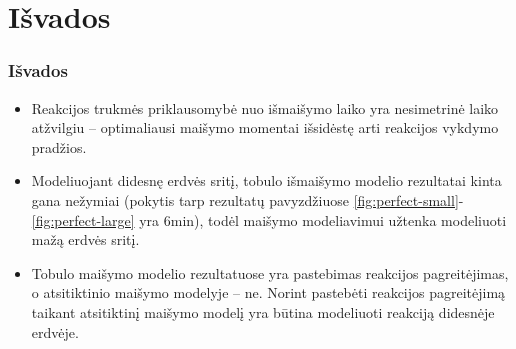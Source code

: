 \documentclass{beamer}
\begin{document}

\section{Išvados}

\begin{frame}
\frametitle{Išvados}
\begin{itemize}
      
  \item Reakcijos trukmės priklausomybė nuo išmaišymo laiko yra nesimetrinė laiko atžvilgiu -- optimaliausi maišymo momentai išsidėstę arti reakcijos vykdymo pradžios.

  \item Modeliuojant didesnę erdvės sritį, tobulo išmaišymo modelio rezultatai kinta gana nežymiai (pokytis tarp rezultatų pavyzdžiuose \ref{fig:perfect-small}-\ref{fig:perfect-large} yra 6min), todėl maišymo modeliavimui užtenka modeliuoti mažą  erdvės sritį.

  \item Tobulo maišymo modelio rezultatuose yra pastebimas reakcijos pagreitėjimas, o atsitiktinio maišymo modelyje -- ne. Norint pastebėti reakcijos pagreitėjimą taikant atsitiktinį maišymo modelį yra būtina modeliuoti reakciją didesnėje erdvėje.
  

\end{itemize}
\end{frame}

\end{document}
